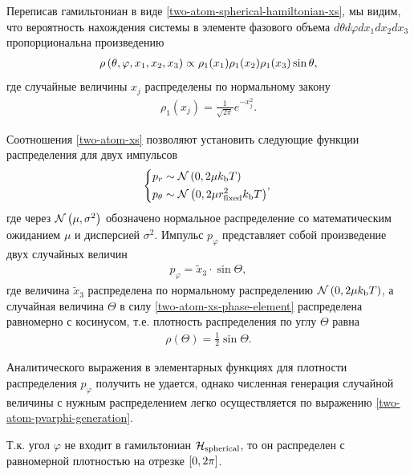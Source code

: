Переписав гамильтониан в виде \eqref{two-atom-spherical-hamiltonian-xs}, мы видим, что вероятность нахождения системы в элементе фазового объема $d\theta d\varphi dx_1 dx_2 dx_3$ пропорциональна произведению 
\begin{gather}
    \rho \left( \theta, \varphi, x_1, x_2, x_3 \right) \propto \rho_1(x_1) \rho_1(x_2) \rho_1(x_3) \sin \theta, \label{two-atom-xs-phase-element}
\end{gather}
%
где случайные величины $x_j$ распределены по нормальному закону
\begin{gather}
    \rho_1 (x_j) = \frac{1}{\sqrt{2 \pi}} e^{-x_j^2}. 
\end{gather}

Соотношения \eqref{two-atom-xs} позволяют установить следующие функции распределения для двух импульсов
\begin{gather}
    \left\{
    \begin{aligned}
        p_r &\sim \mathcal{N} \left( 0, 2 \mu k_\text{b} T \right) \\
        p_\theta &\sim \mathcal{N} \left( 0, 2 \mu r_\text{fixed}^2 k_\text{b} T \right) 
    \end{aligned},
    \right.
\end{gather}
%
где через $\mathcal{N} \left( \mu, \sigma^2 \right)$ обозначено нормальное распределение со математическим ожиданием $\mu$ и дисперсией $\sigma^2$. Импульс $p_\varphi$ представляет собой произведение двух случайных величин
\begin{gather}
    p_\varphi = \tilde{x}_3 \cdot \sin \Theta, \label{two-atom-pvarphi-generation}
\end{gather}
% 
где величина $\tilde{x}_3$ распределена по нормальному распределению $\mathcal{N} \left( 0, 2 \mu k_\text{b} T \right)$, а случайная величина $\Theta$ в силу \eqref{two-atom-xs-phase-element} распределена равномерно с косинусом, т.е. плотность распределения по углу $\Theta$ равна 
\begin{gather}
    \rho(\Theta) = \frac{1}{2} \sin \Theta.
\end{gather}

Аналитического выражения в элементарных функциях для плотности распределения $p_\varphi$ получить не удается, однако численная генерация случайной величины с нужным распределением легко осуществляется по выражению \eqref{two-atom-pvarphi-generation}. \par 
Т.к. угол $\varphi$ не входит в гамильтониан $\mathcal{H}_\text{spherical}$, то он распределен с равномерной плотностью на отрезке $\left[ 0, 2 \pi \right]$.

